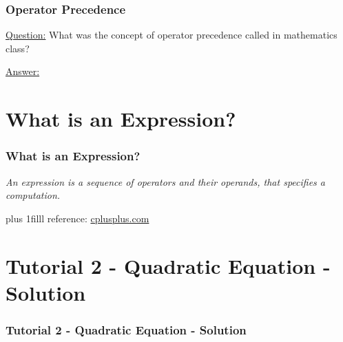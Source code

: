 \documentclass[fleqn]{beamer} %
\newcommand{\sectiontitleIII}{Operator Precedence}
\newcommand{\sectiontitleIV}{What is an Expression?}
\newcommand{\sectiontitleV}{Tutorial 2 - Quadratic Equation - Solution}
\newcommand{\btVFill}{\vskip0pt plus 1filll}
\begin{document}
	\begin{frame} \small
		\frametitle{\sectiontitleIII}
		
		\underline{Question:} What was the concept of operator precedence called in mathematics class? \vspace{15mm}
		
		\underline{Answer:}
		
	\end{frame}


\section{\sectiontitleIV}	
	\begin{frame}[label=sectionIV] \small
		\frametitle{\sectiontitleIV}    
	
		\vspace{15mm}
	
		{\it An expression is a sequence of operators and their operands, that specifies a computation.}

		\btVFill
		\tiny{reference: \href{https://www.cplusplus.com/doc/tutorial/operators/}{cplusplus.com} } 
	\end{frame}

\section{\sectiontitleV}	
	\begin{frame}[label=sectionV,containsverbatim] \small
	\frametitle{\sectiontitleV}    
	

	\end{frame}
\end{document}
